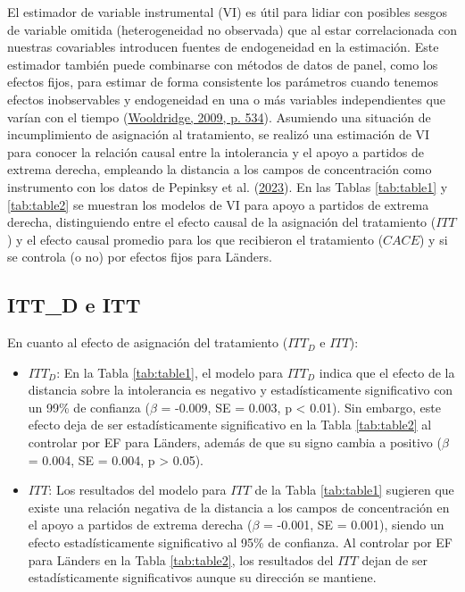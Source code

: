 \documentclass[
  12pt,
  a4paper,
]{article}
\begin{document}
El estimador de variable instrumental (VI) es útil para lidiar con posibles sesgos de variable omitida (heterogeneidad no observada) que al estar correlacionada con nuestras covariables introducen fuentes de endogeneidad en la estimación. Este estimador también puede combinarse con métodos de datos de panel, como los efectos fijos, para estimar de forma consistente los parámetros cuando tenemos efectos inobservables y endogeneidad en una o más variables independientes que varían con el tiempo (\protect\hyperlink{ref-wooldridge_introductory_2009}{Wooldridge, 2009, p. 534}). Asumiendo una situación de incumplimiento de asignación al tratamiento, se realizó una estimación de VI para conocer la relación causal entre la intolerancia y el apoyo a partidos de extrema derecha, empleando la distancia a los campos de concentración como instrumento con los datos de Pepinksy et al. (\protect\hyperlink{ref-pepinsky_modeling_2023}{2023}). En las Tablas \ref{tab:table1} y \ref{tab:table2} se muestran los modelos de VI para apoyo a partidos de extrema derecha, distinguiendo entre el efecto causal de la asignación del tratamiento (\(ITT\)) y el efecto causal promedio para los que recibieron el tratamiento (\(CACE\)) y si se controla (o no) por efectos fijos para Länders.

\hypertarget{itt_d-e-itt}{%
\subsection{ITT\_D e ITT}\label{itt_d-e-itt}}

En cuanto al efecto de asignación del tratamiento (\(ITT_D\) e \(ITT\)):

\begin{itemize}
\item
  \(ITT_D\): En la Tabla \ref{tab:table1}, el modelo para \(ITT_D\) indica que el efecto de la distancia sobre la intolerancia es negativo y estadísticamente significativo con un 99\% de confianza (\(\beta\) = -0.009, SE = 0.003, p \textless{} 0.01). Sin embargo, este efecto deja de ser estadísticamente significativo en la Tabla \ref{tab:table2} al controlar por EF para Länders, además de que su signo cambia a positivo (\(\beta\) = 0.004, SE = 0.004, p \textgreater{} 0.05).
\item
  \(ITT\): Los resultados del modelo para \(ITT\) de la Tabla \ref{tab:table1} sugieren que existe una relación negativa de la distancia a los campos de concentración en el apoyo a partidos de extrema derecha (\(\beta\) = -0.001, SE = 0.001), siendo un efecto estadísticamente significativo al 95\% de confianza. Al controlar por EF para Länders en la Tabla \ref{tab:table2}, los resultados del \(ITT\) dejan de ser estadísticamente significativos aunque su dirección se mantiene.
\end{itemize}
\end{document}
